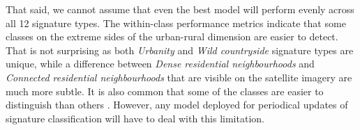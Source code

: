 That said, we cannot assume that even the best model will perform evenly across all 12
signature types. The within-class performance metrics indicate that some classes on the
extreme sides of the urban-rural dimension are easier to detect. That is not surprising
as both \textit{Urbanity} and \textit{Wild countryside} signature types are unique,
while a difference between \textit{Dense residential neighbourhoods} and
\textit{Connected residential neighbourhoods} that are visible on the satellite imagery
are much more subtle. It is also common that some of the classes are easier to
distinguish than others \cite{zanaga_daniele_2021_5571936, karra2021global}. However,
any model deployed for periodical updates of signature classification will have to deal
with this limitation.





